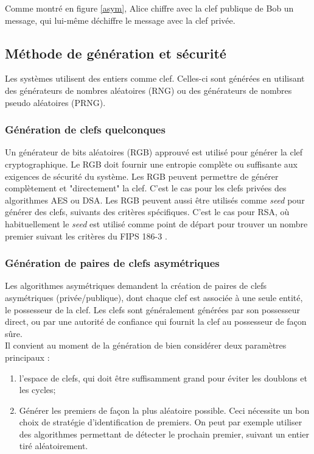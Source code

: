 Comme montré en figure \ref{asym}, Alice chiffre avec la clef publique de Bob un message, qui lui-même déchiffre le message avec la clef privée.

\subsection{Méthode de génération et sécurité}


Les systèmes utilisent des entiers comme clef. Celles-ci sont générées en utilisant des générateurs de nombres aléatoires (RNG) ou des générateurs de nombres pseudo aléatoires (PRNG). 

\subsubsection{Génération de clefs quelconques}
Un générateur de bits aléatoires (RGB) approuvé est utilisé pour générer la clef cryptographique. Le RGB doit fournir une entropie complète ou suffisante aux exigences de sécurité du système. Les RGB peuvent permettre de générer complètement et "directement" la clef. C'est le cas pour les clefs privées des algorithmes AES ou DSA.
Les RGB peuvent aussi être utilisés comme \textit{seed} pour générer des clefs, suivants des critères spécifiques. C'est le cas pour RSA, où habituellement le \textit{seed} est utilisé comme point de départ pour trouver un nombre premier suivant les critères du FIPS 186-3 \cite{fips186-3}.

\subsubsection{Génération de paires de clefs asymétriques}
Les algorithmes asymétriques demandent la création de paires de clefs asymétriques (privée/publique), dont chaque clef est associée à une seule entité, le possesseur de la clef. Les clefs sont généralement générées par son possesseur direct, ou par une autorité de confiance qui fournit la clef au possesseur de façon sûre.\\
Il convient au moment de la génération de bien considérer deux paramètres principaux : 
\begin{enumerate}
\item l'espace de clefs, qui doit être suffisamment grand pour éviter les doublons et les cycles;
\item Générer les premiers de façon la plus aléatoire possible. Ceci nécessite un bon choix de stratégie d'identification de premiers. On peut par exemple utiliser des algorithmes permettant de détecter le prochain premier, suivant un entier tiré aléatoirement. 
\end{enumerate}


